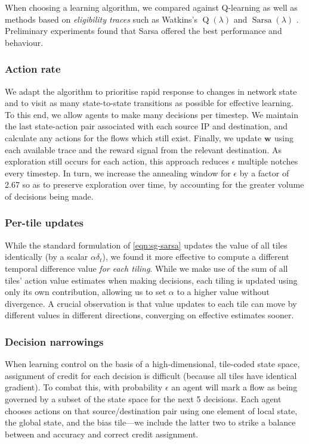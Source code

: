 \documentclass[10pt, times, comsoc]{IEEEtran}
\newcommand{\wvec}[1]{\ensuremath{\bm{w}_{#1}}}
\begin{document}
When choosing a learning algorithm, we compared against Q-learning as well as methods based on \emph{eligibility traces} such as Watkins's $\operatorname{Q}(\lambda)$ \cite[pp. 312--314]{RL2E} and $\operatorname{Sarsa}(\lambda)$ \cite[pp. 305]{RL2E}.
Preliminary experiments found that Sarsa offered the best performance and behaviour.

\subsubsection{Action rate}
We adapt the algorithm to prioritise rapid response to changes in network state and to visit as many state-to-state transitions as possible for effective learning.
To this end, we allow agents to make many decisions per timestep.
We maintain the last state-action pair associated with each source IP and destination, and calculate any actions for the flows which still exist.
Finally, we update $\wvec{}$ using each available trace and the reward signal from the relevant destination.
As exploration still occurs for each action, this approach reduces $\epsilon$ multiple notches every timestep.
In turn, we increase the annealing window for $\epsilon$ by a factor of \num{2.67} so as to preserve exploration over time, by accounting for the greater volume of decisions being made.

\subsubsection{Per-tile updates}
While the standard formulation of \cref{eqn:sg-sarsa} updates the value of all tiles identically (by a scalar $\alpha \delta_t$), we found it more effective to compute a different temporal difference value \emph{for each tiling}.
While we make use of the sum of all tiles' action value estimates when making decisions, each tiling is updated using only its own contribution, allowing us to set $\alpha$ to a higher value without divergence.
A crucial observation is that value updates to each tile can move by different values in different directions, converging on effective estimates sooner.

\subsubsection{Decision narrowings}
When learning control on the basis of a high-dimensional, tile-coded state space, assignment of credit for each decision is difficult (because all tiles have identical gradient).
To combat this, with probability $\epsilon$ an agent will mark a flow as being governed by a subset of the state space for the next 5 decisions.
Each agent chooses actions on that source/destination pair using one element of local state, the global state, and the bias tile---we include the latter two to strike a balance between and accuracy and correct credit assignment.
\end{document}

